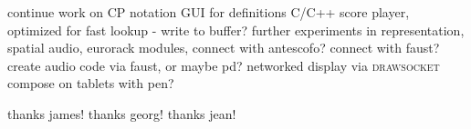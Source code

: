 \documentclass{article}
\def\drawsocket{\textsc{drawsocket}\xspace}
\begin{document}
continue work on CP notation
GUI for definitions
C/C++ score player, optimized for fast lookup - write to buffer?
further experiments in representation, spatial audio, eurorack modules, 
connect with antescofo?
connect with faust? create audio code via faust, or maybe pd?
networked display via \drawsocket compose on tablets with pen?

\begin{acknowledgments}
thanks james! thanks georg! thanks jean!
\end{acknowledgments} 

\balance %

\end{document}
